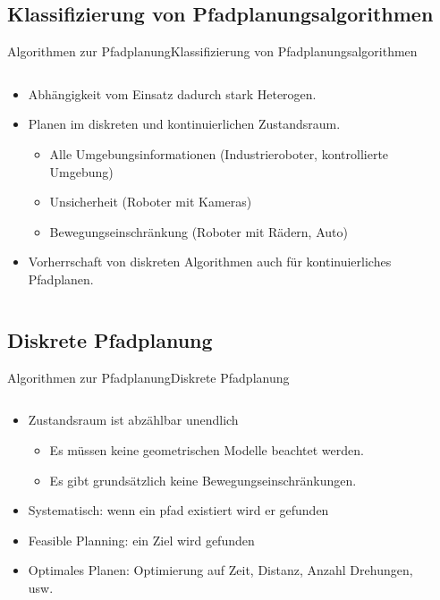 \documentclass[t,aspectratio=169,dvipsnames]{beamer}
\begin{document}
\subsection{Klassifizierung von Pfadplanungsalgorithmen}
\begin{frame}{Algorithmen zur Pfadplanung}{Klassifizierung von Pfadplanungsalgorithmen}
	\begin{columns}
		\begin{column}[T]{0.7\textwidth}
	\begin{itemize}
		\item Abhängigkeit vom Einsatz dadurch stark Heterogen.
		\item Planen im \alert<2>{diskreten} und \alert<3->{kontinuierlichen} Zustandsraum.
		\begin{itemize}
			\item<4-> Alle Umgebungsinformationen (Industrieroboter, kontrollierte Umgebung)
			\item<5-> Unsicherheit (Roboter mit Kameras)
			\item<6-> Bewegungseinschränkung (Roboter mit Rädern, Auto)
		\end{itemize}
		\item Vorherrschaft von diskreten Algorithmen auch für kontinuierliches Pfadplanen. 
	\end{itemize}
\end{column}
	\begin{column}[T]{0.3\textwidth}
	\end{column}
\end{columns}
\end{frame}

\subsection{Diskrete Pfadplanung}
\begin{frame}{Algorithmen zur Pfadplanung}{Diskrete Pfadplanung}
	\begin{columns}
		\begin{column}[T]{0.7\textwidth}
			\begin{itemize}
				\item Zustandsraum ist abzählbar unendlich 
				\begin{itemize}
				\item Es müssen keine geometrischen Modelle beachtet werden.
				\item Es gibt grundsätzlich keine Bewegungseinschränkungen.
			\end{itemize}
				\item Systematisch: \alert<2>{wenn ein pfad existiert wird er gefunden}
				\item Feasible Planning: \alert<3>{ein Ziel wird gefunden}
				\item Optimales Planen: \alert<4>{ Optimierung auf Zeit, Distanz, Anzahl Drehungen, usw.}
			\end{itemize}
		\end{column}
		\begin{column}[T]{0.3\textwidth}
		\end{column}
	\end{columns}
\end{frame}
\end{document}
